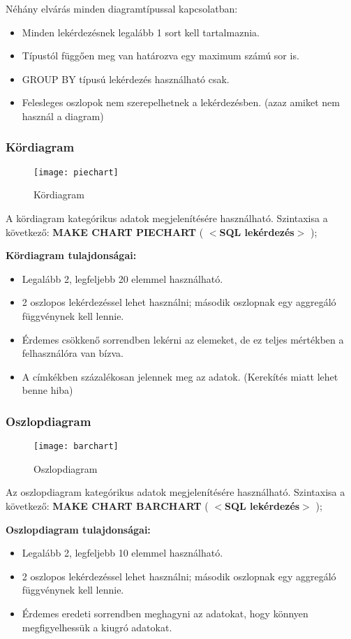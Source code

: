 Néhány elvárás minden diagramtípussal kapcsolatban:
\begin{itemize}
  \item Minden lekérdezésnek legalább 1 sort kell tartalmaznia.
  \item Típustól függően meg van határozva egy maximum számú sor is.
  \item GROUP BY típusú lekérdezés használható csak.
  \item Felesleges oszlopok nem szerepelhetnek a lekérdezésben. (azaz amiket nem használ a diagram)
\end{itemize}

\subsubsection{Kördiagram}
\begin{figure}[ht]
  \begin{center}
    \texttt{[image: piechart]}
  \end{center}
 \caption{Kördiagram}
\end{figure}

A kördiagram kategórikus adatok megjelenítésére használható.
Szintaxisa a következő:
\textbf{{\color{awesomeblue} MAKE CHART PIECHART }} ( \textbf{$<$SQL lekérdezés$>$} );

\textbf{Kördiagram tulajdonságai:}
\begin{itemize}
  \item Legalább 2, legfeljebb 20 elemmel használható.
  \item 2 oszlopos lekérdezéssel lehet használni; második oszlopnak egy aggregáló függvénynek kell lennie.
  \item Érdemes csökkenő sorrendben lekérni az elemeket, de ez teljes mértékben a felhasználóra van bízva.
  \item A címkékben százalékosan jelennek meg az adatok. (Kerekítés miatt lehet benne hiba)
\end{itemize}

\subsubsection{Oszlopdiagram}
\begin{figure}[ht]
  \begin{center}
    \texttt{[image: barchart]}
  \end{center}
 \caption{Oszlopdiagram}
\end{figure}

Az oszlopdiagram kategórikus adatok megjelenítésére használható.
Szintaxisa a következő:
\textbf{{\color{awesomeblue} MAKE CHART BARCHART }} ( \textbf{$<$SQL lekérdezés$>$} );

\textbf{Oszlopdiagram tulajdonságai:}
\begin{itemize}
  \item Legalább 2, legfeljebb 10 elemmel használható.
  \item 2 oszlopos lekérdezéssel lehet használni; második oszlopnak egy aggregáló függvénynek kell lennie.
  \item Érdemes eredeti sorrendben meghagyni az adatokat, hogy könnyen megfigyelhessük a kiugró adatokat.
\end{itemize}